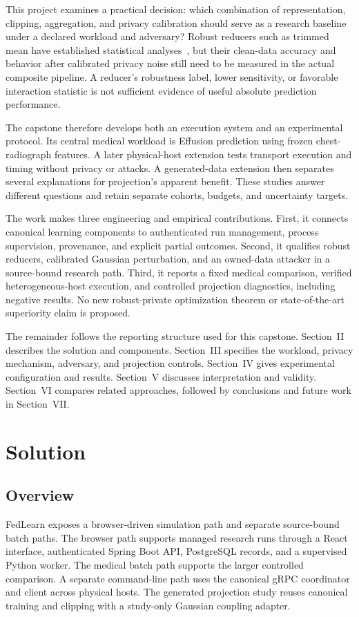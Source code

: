 \documentclass[conference,letterpaper]{IEEEtran}
\begin{document}
This project examines a practical decision: which combination of representation, clipping, aggregation, and privacy calibration should serve as a research baseline under a declared workload and adversary? Robust reducers such as trimmed mean have established statistical analyses~\cite{yin}, but their clean-data accuracy and behavior after calibrated privacy noise still need to be measured in the actual composite pipeline. A reducer's robustness label, lower sensitivity, or favorable interaction statistic is not sufficient evidence of useful absolute prediction performance.

The capstone therefore develops both an execution system and an experimental protocol. Its central medical workload is Effusion prediction using frozen chest-radiograph features. A later physical-host extension tests transport execution and timing without privacy or attacks. A generated-data extension then separates several explanations for projection's apparent benefit. These studies answer different questions and retain separate cohorts, budgets, and uncertainty targets.

The work makes three engineering and empirical contributions. First, it connects canonical learning components to authenticated run management, process supervision, provenance, and explicit partial outcomes. Second, it qualifies robust reducers, calibrated Gaussian perturbation, and an owned-data attacker in a source-bound research path. Third, it reports a fixed medical comparison, verified heterogeneous-host execution, and controlled projection diagnostics, including negative results. No new robust-private optimization theorem or state-of-the-art superiority claim is proposed.

The remainder follows the reporting structure used for this capstone. Section~II describes the solution and components. Section~III specifies the workload, privacy mechanism, adversary, and projection controls. Section~IV gives experimental configuration and results. Section~V discusses interpretation and validity. Section~VI compares related approaches, followed by conclusions and future work in Section~VII.

\section{Solution}
\subsection{Overview}
FedLearn exposes a browser-driven simulation path and separate source-bound batch paths. The browser path supports managed research runs through a React interface, authenticated Spring Boot API, PostgreSQL records, and a supervised Python worker. The medical batch path supports the larger controlled comparison. A separate command-line path uses the canonical gRPC coordinator and client across physical hosts. The generated projection study reuses canonical training and clipping with a study-only Gaussian coupling adapter.
\end{document}
